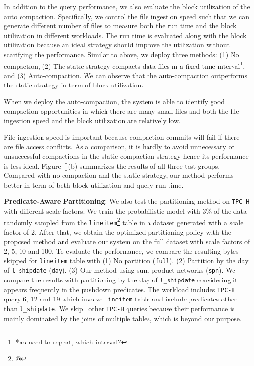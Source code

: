 In addition to the query performance, we also evaluate the block utilization of the auto compaction. Specifically, we control the file ingestion speed such that we can generate different number of files to measure both the run time and the block utilization in different workloads. The run time is evaluated along with the block utilization because an ideal strategy should improve the utilization without scarifying the performance. Similar to above, we deploy three methods: (1) No compaction, (2) The static strategy compacts data files in a fixed time interval\footnote{*no need to repeat, which interval?}, and (3) Auto-compaction. We can observe that the auto-compaction outperforms the static strategy in term of block utilization. 




When we deploy the auto-compaction, the system is able to identify good compaction opportunities in which there are many small files and both the file ingestion speed and the block utilization are relatively low. 

File ingestion speed is important because compaction commits will fail if there are file access conflicts. As a comparison, it is hardly to avoid unnecessary or unsuccessful compactions in the static compaction strategy hence its performance is less ideal. Figure~\ref{}(b) summarizes the results of all three test groups. Compared with no compaction and the static  strategy, our method performs better in term of both block utilization and query run time.


\noindent \textbf{Predicate-Aware Partitioning:} We also test the partitioning method on \texttt{TPC-H}  with different scale factors. We train the probabilistic model with 3\% of the data randomly sampled from the \texttt{lineitem}\footnote{@} table in a dataset generated with a scale factor of 2. After that, we obtain the optimized partitioning policy with the proposed method and evaluate our system on the full dataset with scale factors of 2, 5, 10 and 100. To evaluate the performance, we compare the resulting bytes skipped for \texttt{lineitem} table with (1) No partition (\texttt{full}). (2) Partition by the day of \texttt{l\_shipdate} (\texttt{day}).  (3) Our  method using sum-product networks (\texttt{spn}).
 We compare the results with partitioning by the day of \texttt{l\_shipdate} considering it appears frequently in the pushdown predicates. The workload includes \texttt{TPC-H} query 6, 12 and 19 which involve \texttt{lineitem} table and include predicates other than \texttt{l\_shipdate}. We skip \ other \texttt{TPC-H} queries because their performance is  mainly dominated by the joins of multiple tables, which is beyond our purpose.
 

